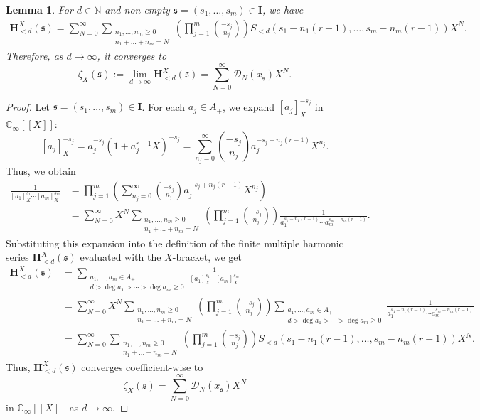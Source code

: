 \documentclass[12pt,reqno]{amsart}
\numberwithin{equation}{section}
\theoremstyle{plain}
\newtheorem{lem}[thm]{Lemma}
\theoremstyle{definition}
\theoremstyle{remark}
\newcommand{\NN}{\mathbb{N}}
\newcommand{\CC}{\mathbb{C}}
\newcommand{\Dcal}{\mathcal{D}}
\newcommand{\mbb}[1]{[\![{#1}]\!]}
\newcommand{\ww}[1]{\mathfrak{#1}}
\renewcommand{\H}{\mathbf{H}}
\newcommand{\Ical}{\mathbf{I}}
\begin{document}
\begin{lem}\label{lem:v-bracket properties}
    For $d\in\NN$ and non-empty $\ww{s}=(s_1,\ldots,s_m)\in\Ical$, we have 
    \begin{align*}
         \H_{<d}^X(\ww{s})= \sum_{N=0}^{\infty}  \sum_{\substack{n_1, \ldots, n_m \ge 0 \\ n_1+\dots+n_m=N}} \left( \prod_{j=1}^m \binom{-s_j}{n_j} \right) S_{<d}(s_1-n_1(r-1),\ldots,s_m-n_m(r-1))X^N.
    \end{align*}
    Therefore, as $d\to\infty$, it converges to
    $$\zeta_X(\ww{s}) := \lim_{d \to \infty} \H_{<d}^X(\ww{s})=\sum_{N=0}^{\infty} \Dcal_N(x_{\ww{s}}) X^N.$$
\end{lem}
\begin{proof}
    Let $\ww{s} = (s_1, \ldots, s_m) \in \Ical$. For each $a_j \in A_+$, we expand $[a_j]_X^{-s_j}$ in $\CC_\infty\mbb{X}$:
        $$[a_j]_X^{-s_j} = a_j^{-s_j}(1 + a_j^{r-1}X)^{-s_j} = \sum_{n_j=0}^{\infty} \binom{-s_j}{n_j} a_j^{-s_j+n_j(r-1)} X^{n_j}.$$
        Thus, we obtain
        \begin{align*}
            \frac{1}{[a_1]_X^{s_1}\cdots [a_m]_X^{s_m}} &= \prod_{j=1}^m \left( \sum_{n_j=0}^{\infty} \binom{-s_j}{n_j} a_j^{-s_j+n_j(r-1)} X^{n_j} \right) \\
            &= \sum_{N=0}^{\infty} X^N \sum_{\substack{n_1, \ldots, n_m \ge 0 \\ n_1+\dots+n_m=N}} \left( \prod_{j=1}^m \binom{-s_j}{n_j} \right) \frac{1}{a_1^{s_1-n_1(r-1)}\cdots a_m^{s_m-n_m(r-1)}}.
        \end{align*}
        Substituting this expansion into the definition of the finite multiple harmonic series $\H_{<d}^X(\ww{s})$ evaluated with the $X$-bracket, we get
        \begin{align*}
            \H_{<d}^X(\ww{s}) &= \sum_{\substack{a_1,\ldots,a_m\in A_+ \\ d>\deg a_1>\cdots>\deg a_m\geq 0}} \frac{1}{[a_1]_X^{s_1}\cdots [a_m]_X^{s_m}} \\
            &= \sum_{N=0}^{\infty} X^N \sum_{\substack{n_1, \ldots, n_m \ge 0 \\ n_1+\dots+n_m=N}} \left( \prod_{j=1}^m \binom{-s_j}{n_j} \right) \sum_{\substack{a_1,\ldots,a_m\in A_+ \\ d>\deg a_1>\cdots>\deg a_m\geq 0}} \frac{1}{a_1^{s_1-n_1(r-1)}\cdots a_m^{s_m-n_m(r-1)}}\\
            &= \sum_{N=0}^{\infty}  \sum_{\substack{n_1, \ldots, n_m \ge 0 \\ n_1+\dots+n_m=N}} \left( \prod_{j=1}^m \binom{-s_j}{n_j} \right) S_{<d}(s_1-n_1(r-1),\ldots,s_m-n_m(r-1))X^N.
        \end{align*} 
        Thus, $\H_{<d}^X(\ww{s})$ converges coefficient-wise to
        $$\zeta_X(\ww{s}) = \sum_{N=0}^{\infty} \Dcal_N(x_{\ww{s}}) X^N$$
        in $\CC_\infty\mbb{X}$ as $d\to\infty$.
\end{proof}
\end{document}

